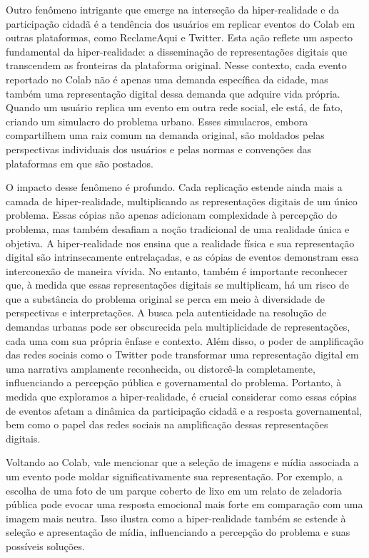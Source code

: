 Outro fenômeno intrigante que emerge na interseção da hiper-realidade e da participação cidadã é a tendência dos usuários em replicar eventos do Colab em outras plataformas, como ReclameAqui e Twitter. Esta ação reflete um aspecto fundamental da hiper-realidade: a disseminação de representações digitais que transcendem as fronteiras da plataforma original. Nesse contexto, cada evento reportado no Colab não é apenas uma demanda específica da cidade, mas também uma representação digital dessa demanda que adquire vida própria. Quando um usuário replica um evento em outra rede social, ele está, de fato, criando um simulacro do problema urbano. Esses simulacros, embora compartilhem uma raiz comum na demanda original, são moldados pelas perspectivas individuais dos usuários e pelas normas e convenções das plataformas em que são postados.

O impacto desse fenômeno é profundo. Cada replicação estende ainda mais a camada de hiper-realidade, multiplicando as representações digitais de um único problema. Essas cópias não apenas adicionam complexidade à percepção do problema, mas também desafiam a noção tradicional de uma realidade única e objetiva. A hiper-realidade nos ensina que a realidade física e sua representação digital são intrinsecamente entrelaçadas, e as cópias de eventos demonstram essa interconexão de maneira vívida. No entanto, também é importante reconhecer que, à medida que essas representações digitais se multiplicam, há um risco de que a substância do problema original se perca em meio à diversidade de perspectivas e interpretações. A busca pela autenticidade na resolução de demandas urbanas pode ser obscurecida pela multiplicidade de representações, cada uma com sua própria ênfase e contexto. Além disso, o poder de amplificação das redes sociais como o Twitter pode transformar uma representação digital em uma narrativa amplamente reconhecida, ou distorcê-la completamente, influenciando a percepção pública e governamental do problema. Portanto, à medida que exploramos a hiper-realidade, é crucial considerar como essas cópias de eventos afetam a dinâmica da participação cidadã e a resposta governamental, bem como o papel das redes sociais na amplificação dessas representações digitais.

Voltando ao Colab, vale mencionar que a seleção de imagens e mídia associada a um evento pode moldar significativamente sua representação. Por exemplo, a escolha de uma foto de um parque coberto de lixo em um relato de zeladoria pública pode evocar uma resposta emocional mais forte em comparação com uma imagem mais neutra. Isso ilustra como a hiper-realidade também se estende à seleção e apresentação de mídia, influenciando a percepção do problema e suas possíveis soluções.

